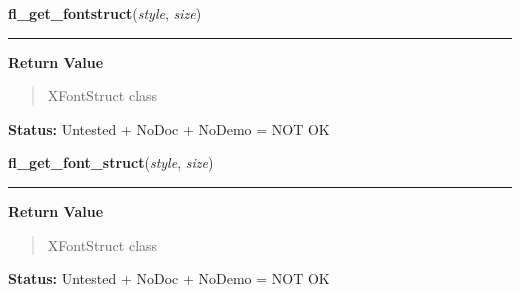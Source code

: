     \label{xformslib:library:fl_get_fontstruct}

    \vspace{0.5ex}

\hspace{.8\funcindent}\begin{boxedminipage}{\funcwidth}

    \raggedright \textbf{fl\_get\_fontstruct}(\textit{style}, \textit{size})

    \vspace{-1.5ex}

    \rule{\textwidth}{0.5\fboxrule}
\setlength{\parskip}{2ex}
\setlength{\parskip}{1ex}
      \textbf{Return Value}
    \vspace{-1ex}

      \begin{quote}
      XFontStruct class

      \end{quote}

\textbf{Status:} Untested + NoDoc + NoDemo = NOT OK



    \end{boxedminipage}

    \label{xformslib:library:fl_get_fontstruct}

    \vspace{0.5ex}

\hspace{.8\funcindent}\begin{boxedminipage}{\funcwidth}

    \raggedright \textbf{fl\_get\_font\_struct}(\textit{style}, \textit{size})

    \vspace{-1.5ex}

    \rule{\textwidth}{0.5\fboxrule}
\setlength{\parskip}{2ex}
\setlength{\parskip}{1ex}
      \textbf{Return Value}
    \vspace{-1ex}

      \begin{quote}
      XFontStruct class

      \end{quote}

\textbf{Status:} Untested + NoDoc + NoDemo = NOT OK



    \end{boxedminipage}

